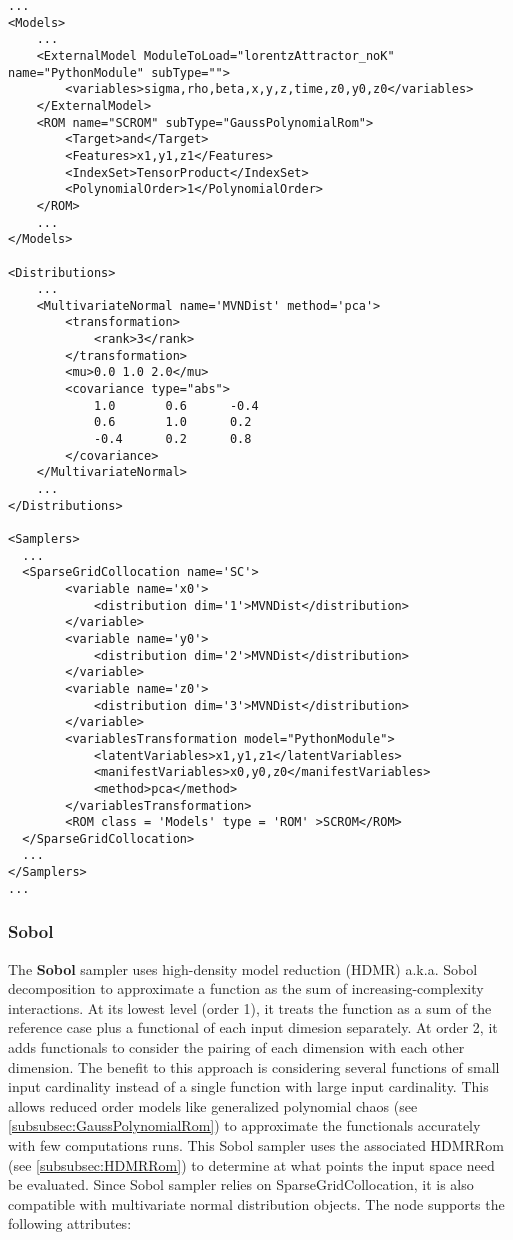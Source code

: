 \begin{lstlisting}[style=XML,morekeywords={ND,grid}]
...
<Models>
    ...
    <ExternalModel ModuleToLoad="lorentzAttractor_noK" name="PythonModule" subType="">
        <variables>sigma,rho,beta,x,y,z,time,z0,y0,z0</variables>
    </ExternalModel>
    <ROM name="SCROM" subType="GaussPolynomialRom">
        <Target>and</Target>
        <Features>x1,y1,z1</Features>
        <IndexSet>TensorProduct</IndexSet>
        <PolynomialOrder>1</PolynomialOrder>
    </ROM>
    ...
</Models>

<Distributions>
    ...
    <MultivariateNormal name='MVNDist' method='pca'>
        <transformation>
            <rank>3</rank>
        </transformation>
        <mu>0.0 1.0 2.0</mu>
        <covariance type="abs">
            1.0       0.6      -0.4
            0.6       1.0      0.2
            -0.4      0.2      0.8
        </covariance>
    </MultivariateNormal>
    ...
</Distributions>

<Samplers>
  ...
  <SparseGridCollocation name='SC'>
        <variable name='x0'>
            <distribution dim='1'>MVNDist</distribution>
        </variable>
        <variable name='y0'>
            <distribution dim='2'>MVNDist</distribution>
        </variable>
        <variable name='z0'>
            <distribution dim='3'>MVNDist</distribution>
        </variable>
        <variablesTransformation model="PythonModule">
            <latentVariables>x1,y1,z1</latentVariables>
            <manifestVariables>x0,y0,z0</manifestVariables>
            <method>pca</method>
        </variablesTransformation>
        <ROM class = 'Models' type = 'ROM' >SCROM</ROM>
  </SparseGridCollocation>
  ...
</Samplers>
...
\end{lstlisting}

\subsubsection{Sobol}
\label{subsubsubsec:SobolSampler}
The \textbf{Sobol} sampler uses high-density model reduction (HDMR) a.k.a. Sobol decomposition to approximate a function as the sum of increasing-complexity
interactions.  At its lowest level (order 1), it treats the function as a sum of the reference case plus a functional of each input dimesion separately.  At
order 2, it adds functionals to consider the pairing of each dimension with each other dimension.  The benefit to this approach is considering several functions
of small input cardinality instead of a single function with large input cardinality.  This allows reduced order models like generalized polynomial chaos
(see \ref{subsubsec:GaussPolynomialRom}) to approximate the functionals accurately with few computations runs.  This Sobol sampler uses the associated HDMRRom
(see \ref{subsubsec:HDMRRom}) to determine at what points the input space need be evaluated. Since Sobol sampler relies on SparseGridCollocation, it is also compatible with
multivariate normal distribution objects. The  node supports the following attributes: 


